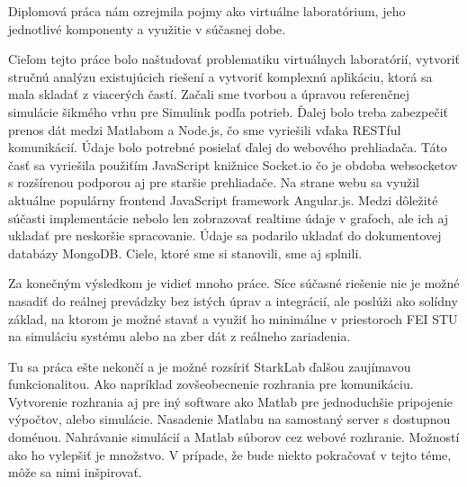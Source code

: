 \indent Diplomová práca nám ozrejmila pojmy ako virtuálne laboratórium, jeho jednotlivé komponenty a využitie v súčasnej dobe.

Cieľom tejto práce bolo naštudovať problematiku virtuálnych laboratórií, vytvoriť stručnú analýzu existujúcich riešení a vytvoriť komplexnú aplikáciu, ktorá sa mala skladať z viacerých častí. Začali sme tvorbou a úpravou referenčnej simulácie šikmého vrhu pre Simulink podľa potrieb. Ďalej bolo treba zabezpečiť prenos dát medzi Matlabom a Node.js, čo sme vyriešili vďaka RESTful komunikácií. Údaje bolo potrebné posielať ďalej do webového prehliadača. Táto časť sa vyriešila použiťím JavaScript knižnice Socket.io čo je obdoba websocketov s rozšírenou podporou aj pre staršie prehliadače. Na strane webu sa využil aktuálne populárny frontend JavaScript framework Angular.js. Medzi dôležité súčasti implementácie nebolo len zobrazovať realtime údaje v grafoch, ale ich aj ukladať pre neskoršie spracovanie. Údaje sa podarilo ukladať do dokumentovej databázy MongoDB.
Ciele, ktoré sme si stanovili, sme aj splnili.

Za konečným výsledkom je vidieť mnoho práce. Síce súčasné riešenie nie je možné nasadiť do reálnej prevádzky bez istých úprav a integrácií, ale poslúži ako solídny základ, na ktorom je možné stavať a využiť ho minimálne v priestoroch FEI STU na simuláciu systému alebo na zber dát z reálneho zariadenia.

Tu sa práca ešte nekončí a je možné rozsíriť StarkLab ďalšou zaujímavou funkcionalitou. Ako napríklad zovšeobecnenie rozhrania pre komunikáciu. Vytvorenie rozhrania aj pre iný software ako Matlab pre jednoduchšie pripojenie výpočtov, alebo simulácie. Nasadenie Matlabu na samostaný server s dostupnou doménou. Nahrávanie simulácií a Matlab súborov cez webové rozhranie. Možností ako ho vylepšiť je množstvo. V prípade, že bude niekto pokračovať v tejto téme, môže sa nimi inšpirovať.